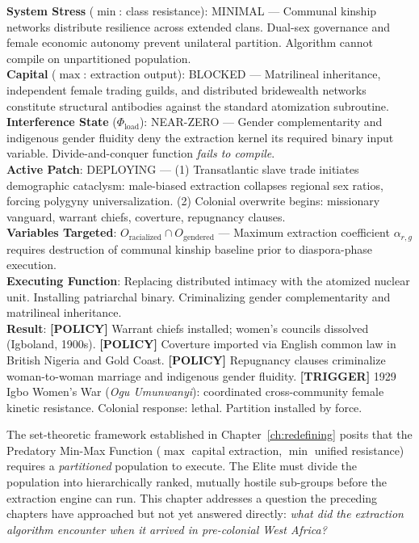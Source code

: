 \begin{tcolorbox}[colback=black!5, colframe=black!70, fonttitle=\bfseries\ttfamily, title=RUNTIME LOG: WEST AFRICA (PRE-COLONIAL BASELINE $\rightarrow$ COLONIAL OVERWRITE{,} 1450--1950 CE)]
\ttfamily\small
\textbf{System Stress} ($\min$: class resistance): MINIMAL --- Communal kinship networks distribute resilience across extended clans. Dual-sex governance and female economic autonomy prevent unilateral partition. Algorithm cannot compile on unpartitioned population.\\
\textbf{Capital} ($\max$: extraction output): BLOCKED --- Matrilineal inheritance, independent female trading guilds, and distributed bridewealth networks constitute structural antibodies against the standard atomization subroutine.\\
\textbf{Interference State} ($\Phi_{\text{load}}$): NEAR-ZERO --- Gender complementarity and indigenous gender fluidity deny the extraction kernel its required binary input variable. Divide-and-conquer function \textit{fails to compile}.\\
\textbf{Active Patch}: DEPLOYING --- (1) Transatlantic slave trade initiates demographic cataclysm: male-biased extraction collapses regional sex ratios, forcing polygyny universalization. (2) Colonial overwrite begins: missionary vanguard, warrant chiefs, coverture, repugnancy clauses.\\
\textbf{Variables Targeted}: $O_{\text{racialized}} \cap O_{\text{gendered}}$ --- Maximum extraction coefficient $\alpha_{r,g}$ requires destruction of communal kinship baseline prior to diaspora-phase execution.\\
\textbf{Executing Function}: Replacing distributed intimacy with the atomized nuclear unit. Installing patriarchal binary. Criminalizing gender complementarity and matrilineal inheritance.\\
\textbf{Result}: \textbf{[POLICY]} Warrant chiefs installed; women's councils dissolved (Igboland, 1900s). \textbf{[POLICY]} Coverture imported via English common law in British Nigeria and Gold Coast. \textbf{[POLICY]} Repugnancy clauses criminalize woman-to-woman marriage and indigenous gender fluidity. \textbf{[TRIGGER]} 1929 Igbo Women's War (\textit{Ogu Umunwanyi}): coordinated cross-community female kinetic resistance. Colonial response: lethal. Partition installed by force.
\end{tcolorbox}

\medskip

The set-theoretic framework established in Chapter~\ref{ch:redefining} posits that the Predatory Min-Max Function ($\max$ capital extraction, $\min$ unified resistance) requires a \textit{partitioned} population to execute. The Elite must divide the population into hierarchically ranked, mutually hostile sub-groups before the extraction engine can run. This chapter addresses a question the preceding chapters have approached but not yet answered directly: \textit{what did the extraction algorithm encounter when it arrived in pre-colonial West Africa?}

